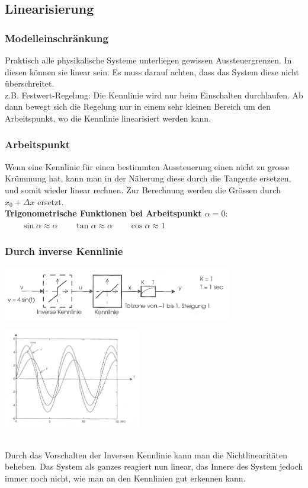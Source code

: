 	 
	
	\subsection{Linearisierung}
		\subsubsection{Modelleinschränkung }
			Praktisch alle physikalische Systeme unterliegen gewissen Aussteuergrenzen.
			In diesen können sie linear sein. Es muss darauf achten, dass  das System
			diese nicht überschreitet. \\
			z.B. Festwert-Regelung: Die Kennlinie wird nur beim Einschalten durchlaufen.
			Ab dann bewegt sich die Regelung nur in einem sehr kleinen Bereich um den
			Arbeitspunkt, wo die Kennlinie linearisiert werden kann. \\
			
		\subsubsection{Arbeitspunkt }
			Wenn eine Kennlinie für einen bestimmten Aussteuerung einen nicht zu grosse
			Krümmung hat, kann man in der Näherung diese durch die Tangente ersetzen, und
			somit wieder linear rechnen. Zur Berechnung werden die Grössen durch 
			$x_0+\Delta x$ ersetzt. \\
			\textbf{Trigonometrische Funktionen bei Arbeitspunkt $\alpha = 0$}: $\qquad \sin \alpha \approx
			\alpha \qquad \tan \alpha \approx \alpha \qquad \cos \alpha \approx 1$
			
		\subsubsection{Durch inverse Kennlinie }
		\begin{minipage}{11cm}
			\includegraphics[width=10cm]{./bilder/Kennlinienkompensation.jpg}
        \end{minipage}
		\begin{minipage}{6cm}
        	\includegraphics[width=6cm]{./bilder/Kennlinienkompensation_dia.jpg}
        \end{minipage}\\
			Durch das Vorschalten der Inversen Kennlinie kann man die Nichtlinearitäten
			beheben. Das System als ganzes reagiert nun linear, das Innere des System
			jedoch immer noch nicht, wie man an den Kennlinien gut erkennen kann.
			
